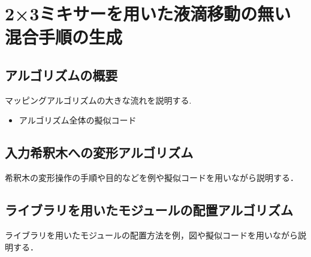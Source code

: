 \chapter{{2×3ミキサーを用いた液滴移動の無い混合手順の生成}}
\section{アルゴリズムの概要}
マッピングアルゴリズムの大きな流れを説明する.
\begin{itemize}
    \item {アルゴリズム全体の擬似コード}
\end{itemize}
\section{入力希釈木への変形アルゴリズム}
希釈木の変形操作の手順や目的などを例や擬似コードを用いながら説明する．
\section{ライブラリを用いたモジュールの配置{アルゴリズム}}
ライブラリを用いたモジュールの配置方法を例，図や擬似コードを用いながら説明する．
